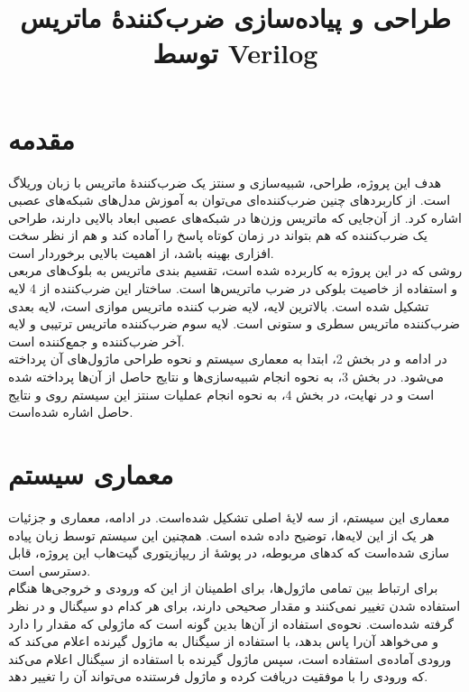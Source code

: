 \documentclass[conference]{IEEEtran-ModifiedForMVIP}
\begin{document}
\IEEEoverridecommandlockouts 

\title{
طراحی و پیاده‌سازی ضرب‌کنندهٔ ماتریس توسط Verilog
}

\author{
}

\maketitle

\section{مقدمه}
هدف این پروژه، طراحی، شبیه‌سازی و سنتز یک ضرب‌کنندهٔ ماتریس با زبان وریلاگ است.
از کاربرد‌های چنین ضرب‌کنند‌ه‌ای می‌توان
به آموزش مدل‌های شبکه‌های عصبی 
اشاره کرد.
از آن‌جایی که ماتریس‌ وزن‌ها در شبکه‌های عصبی ابعاد بالایی دارند، طراحی یک ضرب‌کننده که هم بتواند در زمان کوتاه پاسخ را آماده کند و 
هم از نظر سخت افزاری بهینه باشد، از اهمیت بالایی برخوردار است.
\\
روشی که در این پروژه به کاربرده شده است، تقسیم بندی ماتریس به بلوک‌های مربعی و استفاده از خاصیت بلوکی در ضرب ماتریس‌‌ها است. 
ساختار این ضرب‌کننده از 4 لایه تشکیل شده است. بالاترین لایه، لایه ضرب کننده ماتریس موازی است، لایه بعدی ضرب‌کننده 
ماتریس سطری و ستونی است. لایه سوم ضرب‌کننده ماتریس ترتیبی و لایه آخر ضرب‌کننده و جمع‌کننده‌
است.\\
در ادامه و در بخش 2، ابتدا به معماری سیستم و نحوه طراحی ماژول‌های آن پرداخته می‌شود. در بخش 3، به نحوه انجام شبیه‌سازی‌ها
و نتایج حاصل از آن‌ها پرداخته شده است و در نهایت، در بخش 4، به نحوه انجام عملیات سنتز این سیستم روی 
و نتایج حاصل اشاره شده‌است.
\section{معماری سیستم}

معماری این سیستم، از سه لایهٔ اصلی تشکیل شده‌است. در ادامه، معماری و جزئیات هر یک از این لایه‌ها، توضیح داده شده است. همچنین این سیستم توسط زبان
پیاده سازی شده‌است که کدهای مربوطه، در پوشهٔ
از ریپازیتوری گیت‌هاب
این پروژه، قابل دسترسی است.
\\
برای ارتباط بین تمامی ماژول‌ها، برای اطمینان از این که ورودی و خروجی‌ها هنگام استفاده شدن تغییر نمی‌کنند و مقدار صحیحی دارند، برای هر کدام دو سیگنال
و
در نظر گرفته شده‌است.
نحوه‌ی استفاده از آن‌ها بدین گونه است که ماژولی که مقدار را دارد و می‌خواهد آن‌را پاس بدهد، با استفاده از سیگنال
به ماژول گیرنده اعلام می‌کند که ورودی آماده‌ی استفاده است،
سپس ماژول گیرنده با استفاده از سیگنال
اعلام می‌کند که ورودی را با موفقیت دریافت کرده و ماژول فرستنده می‌تواند آن را تغییر دهد.
\end{document}
